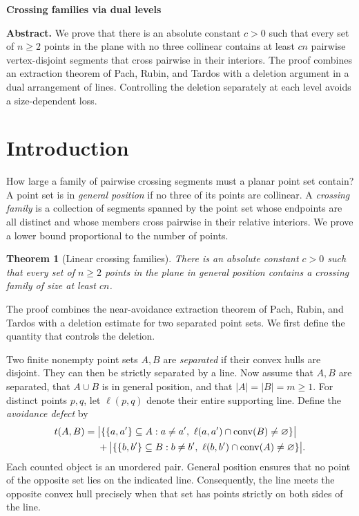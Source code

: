 \documentclass[12pt]{article}
\newcommand{\conv}{\operatorname{conv}}
\newtheorem{theorem}{Theorem}
\begin{document}
\begin{center}
\textbf{Crossing families via dual levels}
\end{center}

\noindent\textbf{Abstract.}
We prove that there is an absolute constant \(c>0\) such that every
set of \(n\geq2\) points in the plane with no three collinear contains
at least \(cn\) pairwise vertex-disjoint segments that cross pairwise
in their interiors. The proof combines an extraction theorem of
Pach, Rubin, and Tardos with a deletion argument in a dual arrangement
of lines. Controlling the deletion separately at each level avoids
a size-dependent loss.

\section{Introduction}\label{sec:introduction}

How large a family of pairwise crossing segments must a planar point
set contain? A point set is in \emph{general position} if no three of
its points are collinear. A \emph{crossing family} is a collection of
segments spanned by the point set whose endpoints are all distinct
and whose members cross pairwise in their relative interiors.
We prove a lower bound proportional to the number of points.

\begin{theorem}[Linear crossing families]\label{thm:main}
There is an absolute constant \(c>0\) such that every set of \(n\geq2\)
points in the plane in general position contains a crossing family
of size at least \(cn\).
\end{theorem}

The proof combines the near-avoidance extraction theorem of Pach,
Rubin, and Tardos \cite[Lemma~3.3]{PRT2021} with a deletion estimate
for two separated point sets. We first define the quantity that
controls the deletion.

Two finite nonempty point sets \(A,B\) are \emph{separated} if their
convex hulls are disjoint. They can then be strictly separated by a
line. Now assume that \(A,B\) are separated, that \(A\cup B\) is
in general position, and that \(|A|=|B|=m\geq1\).
For distinct points \(p,q\), let \(\ell(p,q)\)
denote their entire supporting line. Define the \emph{avoidance defect}
by
\begin{align}
 t(A,B)={}&
 \bigl|\{\{a,a'\}\subseteq A:
     a\ne a',\ \ell(a,a')\cap\conv(B)\ne\varnothing\}\bigr|
 \notag\\
 &+\bigl|\{\{b,b'\}\subseteq B:
     b\ne b',\ \ell(b,b')\cap\conv(A)\ne\varnothing\}\bigr|.
 \label{eq:defect}
\end{align}
Each counted object is an unordered pair. General position ensures
that no point of the opposite set lies on the indicated line.
Consequently, the line meets the opposite convex hull precisely
when that set has points strictly on both sides of the line.
\end{document}
